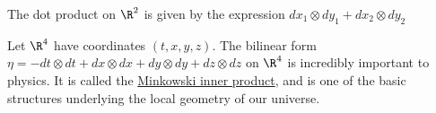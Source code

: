 \documentclass{ximera}
\begin{document}
	\begin{example}
	  The dot product on $\R^2$ is given by the expression $dx_1 \otimes dy_1 + dx_2 \otimes dy_2$
	\end{example}
	
	\begin{example}
		Let $\R^4$ have coordinates $(t,x,y,z)$.  The bilinear form $\eta = -dt \otimes dt +dx \otimes dx + dy\otimes dy + dz \otimes dz $ on $\R^4$ is incredibly important to physics.  
		It is called the \href{http://en.wikipedia.org/wiki/Minkowski_space}{Minkowski inner product}, and is one of the basic structures underlying the local geometry of our 
		universe.
	\end{example}
	


		
	
	
	
	
	
\end{document}
